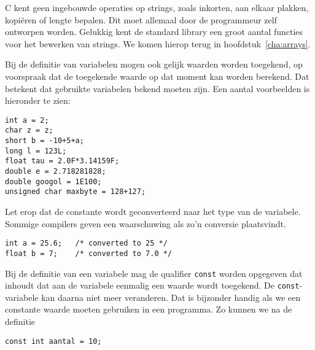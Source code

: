 C kent geen ingebouwde operaties op strings, zoals inkorten, aan elkaar plakken, kopiëren of lengte bepalen. Dit moet allemaal door de programmeur zelf ontworpen worden. Gelukkig kent de standard library een groot aantal functies voor het bewerken van strings. We komen hierop terug in hoofdstuk~\ref{cha:arrays}.

Bij de definitie van variabelen mogen ook gelijk waarden worden toegekend, op voorspraak dat de toegekende waarde op dat moment kan worden berekend. Dat betekent dat gebruikte variabelen bekend moeten zijn. Een aantal voorbeelden is hieronder te zien:

\hspace*{1em}\texttt{int a = 2;}\\
\hspace*{1em}\texttt{char z = \textquotesingle z\textquotesingle;}\\
\hspace*{1em}\texttt{short b = -10+5+a;}\\
\hspace*{1em}\texttt{long l = 123L;}\\
\hspace*{1em}\texttt{float tau = 2.0F*3.14159F;}\\
\hspace*{1em}\texttt{double e = 2.718281828;}\\
\hspace*{1em}\texttt{double googol = 1E100;}\\
\hspace*{1em}\texttt{unsigned char maxbyte = 128+127;}

Let erop dat de constante wordt geconverteerd naar het type van de variabele. Sommige compilers geven een waarschuwing als zo'n conversie plaatsvindt.

\hspace*{1em}\texttt{int a = 25.6; \ \ /* converted to 25 */}\\
\hspace*{1em}\texttt{float b = 7; \ \ \ /* converted to 7.0 */}

Bij de definitie van een variabele mag de qualifier \texttt{const} worden opgegeven dat inhoudt dat aan  de variabele eenmalig een waarde wordt toegekend. De \texttt{const}-variabele kan daarna niet meer veranderen. Dat is bijzonder handig als we een constante waarde moeten gebruiken in een programma. Zo kunnen we na de definitie

\hspace*{1em}\texttt{const int aantal = 10;}

